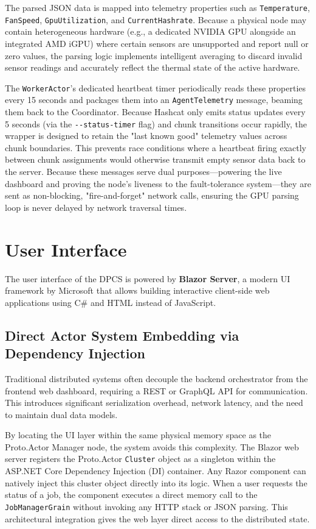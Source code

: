 The parsed JSON data is mapped into telemetry properties such as \verb|Temperature|, \verb|FanSpeed|, \verb|GpuUtilization|, and \verb|CurrentHashrate|. Because a physical node may contain heterogeneous hardware (e.g., a dedicated NVIDIA GPU alongside an integrated AMD iGPU) where certain sensors are unsupported and report null or zero values, the parsing logic implements intelligent averaging to discard invalid sensor readings and accurately reflect the thermal state of the active hardware.

The \verb|WorkerActor|'s dedicated heartbeat timer periodically reads these properties every 15 seconds and packages them into an \verb|AgentTelemetry| message, beaming them back to the Coordinator. Because Hashcat only emits status updates every 5 seconds (via the \verb|--status-timer| flag) and chunk transitions occur rapidly, the wrapper is designed to retain the "last known good" telemetry values across chunk boundaries. This prevents race conditions where a heartbeat firing exactly between chunk assignments would otherwise transmit empty sensor data back to the server. Because these messages serve dual purposes—powering the live dashboard and proving the node's liveness to the fault-tolerance system—they are sent as non-blocking, "fire-and-forget" network calls, ensuring the GPU parsing loop is never delayed by network traversal times.




\section{User Interface}

The user interface of the DPCS is powered by \textbf{Blazor Server}, a modern UI framework by Microsoft that allows building interactive client-side web applications using C\# and HTML instead of JavaScript. 

\subsection{Direct Actor System Embedding via Dependency Injection}
Traditional distributed systems often decouple the backend orchestrator from the frontend web dashboard, requiring a REST or GraphQL API for communication. This introduces significant serialization overhead, network latency, and the need to maintain dual data models.

By locating the UI layer within the same physical memory space as the Proto.Actor Manager node, the system avoids this complexity. The Blazor web server registers the Proto.Actor \verb|Cluster| object as a singleton within the ASP.NET Core Dependency Injection (DI) container. Any Razor component can natively inject this cluster object directly into its logic. When a user requests the status of a job, the component executes a direct memory call to the \verb|JobManagerGrain| without invoking any HTTP stack or JSON parsing. This architectural integration gives the web layer direct access to the distributed state.

